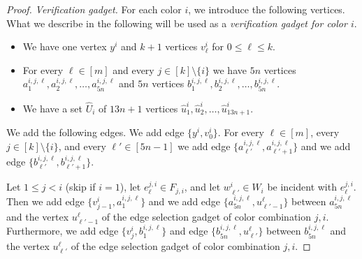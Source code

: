 \documentclass[a4paper,UKenglish,cleveref, autoref, thm-restate, anonymous]{lipics-v2021}
\begin{document}
\begin{proof}
    
    \emph{Verification gadget.} For each color $i$, we introduce the following vertices. What we describe in the following will be used as a \emph{verification gadget for color $i$}.
    \begin{itemize}
        \item We have one vertex $y^i$ and $k+1$ vertices $v^i_\ell$ for $0\le \ell\le k$.
        \item For every $\ell\in[m]$ and every $j\in[k]\setminus\{i\}$ we have $5n$ vertices $a^{i,j,\ell}_1,a^{i,j,\ell}_2,\ldots,a^{i,j,\ell}_{5n}$ and $5n$ vertices $b^{i,j,\ell}_1,b^{i,j,\ell}_2,\ldots,b^{i,j,\ell}_{5n}$.
        \item We have a set $\hat{U}_i$ of $13n+1$ vertices $\hat{u}^i_1,\hat{u}^i_2,\ldots,\hat{u}^i_{13n+1}$.
    \end{itemize}
    We add the following edges. We add edge $\{y^i,v^i_0\}$.
    For every $\ell\in[m]$, every $j\in[k]\setminus\{i\}$, and every $\ell'\in[5n-1]$ we add edge $\{a^{i,j,\ell}_{\ell'},a^{i,j,\ell}_{\ell'+1}\}$ and we add edge $\{b^{i,j,\ell}_{\ell'},b^{i,j,\ell}_{\ell'+1}\}$.
    
    Let $1\le j<i$ (skip if $i=1$), let $e_\ell^{j,i}\in F_{j,i}$, and let $w^i_{\ell'}\in W_i$ be incident with $e_\ell^{j,i}$. Then we add edge $\{v_{j-1}^i,a^{i,j,\ell}_{1}\}$ and we add edge $\{a^{i,j,\ell}_{5n},u^\ell_{\ell'-1}\}$ between $a^{i,j,\ell}_{5n}$ and the vertex $u^\ell_{\ell'-1}$ of the edge selection gadget of color combination $j,i$.
    Furthermore, we add edge $\{v_{j}^i,b^{i,j,\ell}_{1}\}$ and edge $\{b^{i,j,\ell}_{5n},u^\ell_{\ell'}\}$ between $b^{i,j,\ell}_{5n}$ and the vertex $u^\ell_{\ell'}$ of the edge selection gadget of color combination $j,i$.


\end{proof}
\end{document}

